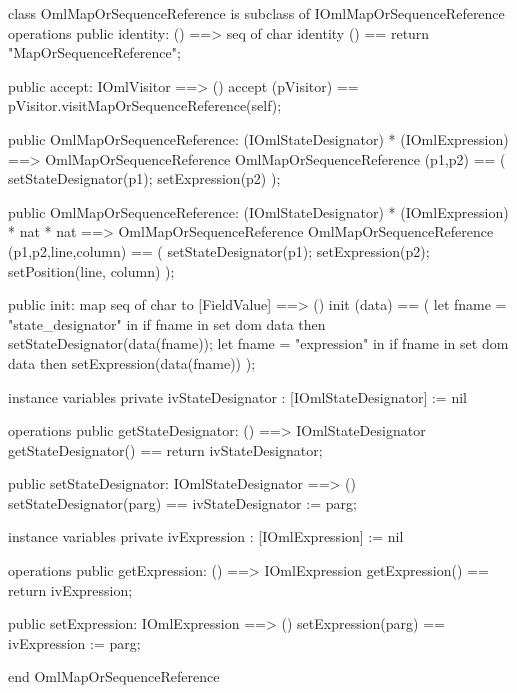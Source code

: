 \begin{vdm_al}
class OmlMapOrSequenceReference is subclass of IOmlMapOrSequenceReference
operations
  public identity: () ==> seq of char
  identity () == return "MapOrSequenceReference";

  public accept: IOmlVisitor ==> ()
  accept (pVisitor) == pVisitor.visitMapOrSequenceReference(self);

  public OmlMapOrSequenceReference:
    (IOmlStateDesignator) *
    (IOmlExpression) ==> OmlMapOrSequenceReference
  OmlMapOrSequenceReference (p1,p2) == 
    ( setStateDesignator(p1);
      setExpression(p2) );

  public OmlMapOrSequenceReference:
    (IOmlStateDesignator) *
    (IOmlExpression) *
    nat *
    nat ==> OmlMapOrSequenceReference
  OmlMapOrSequenceReference (p1,p2,line,column) == 
    ( setStateDesignator(p1);
      setExpression(p2);
      setPosition(line, column) );

  public init: map seq of char to [FieldValue] ==> ()
  init (data) ==
    ( let fname = "state_designator" in
        if fname in set dom data
        then setStateDesignator(data(fname));
      let fname = "expression" in
        if fname in set dom data
        then setExpression(data(fname)) );

instance variables
  private ivStateDesignator : [IOmlStateDesignator] := nil

operations
  public getStateDesignator: () ==> IOmlStateDesignator
  getStateDesignator() == return ivStateDesignator;

  public setStateDesignator: IOmlStateDesignator ==> ()
  setStateDesignator(parg) == ivStateDesignator := parg;

instance variables
  private ivExpression : [IOmlExpression] := nil

operations
  public getExpression: () ==> IOmlExpression
  getExpression() == return ivExpression;

  public setExpression: IOmlExpression ==> ()
  setExpression(parg) == ivExpression := parg;

end OmlMapOrSequenceReference
\end{vdm_al}

